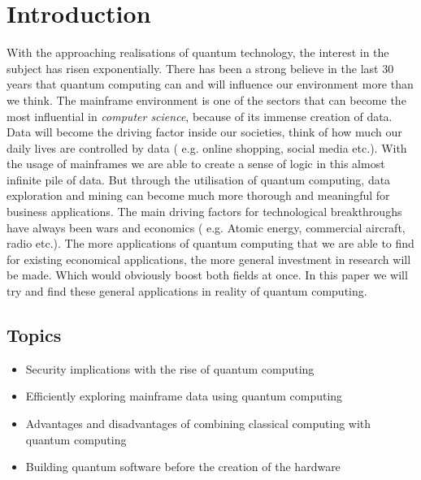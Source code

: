 
\section{Introduction} %
\label{sec:introductie}

With the approaching realisations of quantum technology, the interest in the subject has risen exponentially. There has been a strong believe in the last 30 years that quantum computing can and will influence our environment more than we think. The mainframe environment is one of the sectors that can become the most influential in \emph{computer science}, because of its immense creation of data. Data will become the driving factor inside our societies, think of how much our daily lives are controlled by data ( e.g. online shopping, social media etc.). With the usage of mainframes we are able to create a sense of logic in this almost infinite pile of data. But through the utilisation of quantum computing, data exploration and mining can become much more thorough and meaningful for business applications. The main driving factors for technological breakthroughs have always been wars and economics ( e.g. Atomic energy, commercial aircraft, radio etc.). The more applications of quantum computing that we are able to find for existing economical applications, the more general investment in research will be made. Which would obviously boost both fields at once. In this paper we will try and find these general applications in reality of quantum computing.

\subsection{Topics}
\begin{itemize}
  \item Security implications with the rise of quantum computing
  \item Efficiently exploring mainframe data using quantum computing
  \item Advantages and disadvantages of combining classical computing with quantum computing
  \item Building quantum software before the creation of the hardware
\end{itemize}

